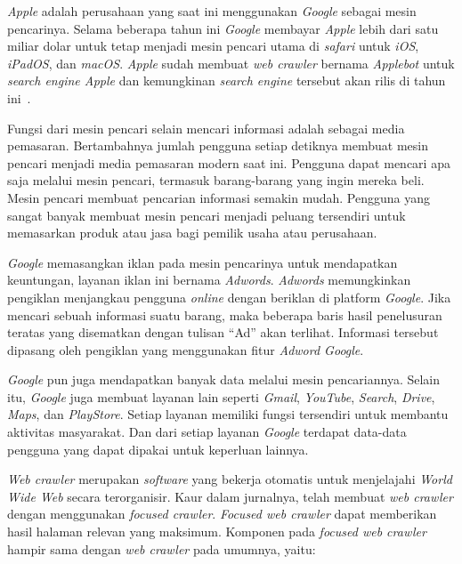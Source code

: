 \emph{Apple} adalah perusahaan yang saat ini menggunakan \emph{Google} sebagai mesin pencarinya. Selama beberapa tahun ini \emph{Google} membayar \emph{Apple} lebih dari satu miliar dolar untuk tetap menjadi mesin pencari utama di \emph{safari} untuk \emph{iOS}, \emph{iPadOS}, dan \emph{macOS}. \emph{Apple} sudah membuat \emph{web crawler} bernama \emph{Applebot} untuk \emph{search engine Apple} dan kemungkinan \emph{search engine} tersebut akan rilis di tahun ini~\cite{jonhenshaw_2020}.

Fungsi dari mesin pencari selain mencari informasi adalah sebagai media pemasaran. Bertambahnya jumlah pengguna setiap detiknya membuat mesin pencari menjadi media pemasaran modern saat ini. Pengguna dapat mencari apa saja melalui mesin pencari, termasuk barang-barang yang ingin mereka beli. Mesin pencari membuat pencarian informasi semakin mudah. Pengguna yang sangat banyak membuat mesin pencari menjadi peluang tersendiri untuk memasarkan produk atau jasa bagi pemilik usaha atau perusahaan.

\emph{Google} memasangkan iklan pada mesin pencarinya untuk mendapatkan keuntungan, layanan iklan ini bernama \emph{Adwords}. \emph{Adwords} memungkinkan pengiklan menjangkau pengguna \emph{online} dengan beriklan di platform \emph{Google}. Jika mencari sebuah informasi suatu barang, maka beberapa baris hasil penelusuran teratas yang disematkan dengan tulisan “Ad” akan terlihat. Informasi tersebut dipasang oleh pengiklan yang menggunakan fitur \emph{Adword Google}.

\emph{Google} pun juga mendapatkan banyak data melalui mesin pencariannya. Selain itu, \emph{Google} juga membuat layanan lain seperti \emph{Gmail}, \emph{YouTube}, \emph{Search}, \emph{Drive}, \emph{Maps}, dan \emph{PlayStore}. Setiap layanan memiliki fungsi tersendiri untuk membantu aktivitas masyarakat. Dan dari setiap layanan \emph{Google} terdapat data-data pengguna yang dapat dipakai untuk keperluan lainnya.


\emph{Web crawler} merupakan \emph{software} yang bekerja otomatis untuk menjelajahi \emph{World Wide Web} secara terorganisir. Kaur\cite{kaur2020simhar} dalam jurnalnya, telah membuat \emph{web crawler} dengan menggunakan \emph{focused crawler}. \emph{Focused web crawler} dapat memberikan hasil halaman relevan yang maksimum. Komponen pada \emph{focused web crawler} hampir sama dengan \emph{web crawler} pada umumnya, yaitu:

